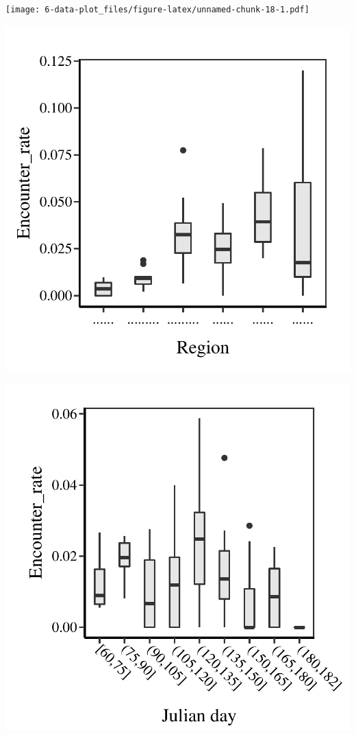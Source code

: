 \documentclass[
]{article}
\begin{document}
\texttt{[image: 6-data-plot\_files/figure-latex/unnamed-chunk-18-1.pdf]}

\includegraphics{6-data-plot_files/figure-latex/unnamed-chunk-20-1.pdf}

\includegraphics{6-data-plot_files/figure-latex/unnamed-chunk-21-1.pdf}
\end{document}
